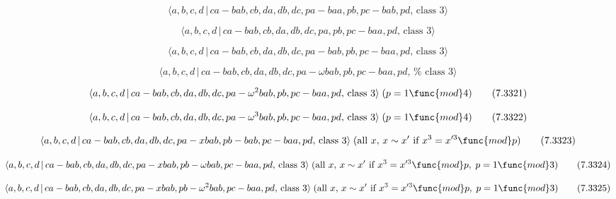 \documentclass[10pt]{article}
\begin{document}
\begin{equation}
\langle a,b,c,d\,|\,ca-bab,cb,da,db,dc,pa-baa,pb,pc-bab,pd,\,\text{class }%
3\rangle  \tag{7.3317}
\end{equation}

\begin{equation}
\langle a,b,c,d\,|\,ca-bab,cb,da,db,dc,pa,pb,pc-baa,pd,\,\text{class }%
3\rangle  \tag{7.3318}
\end{equation}

\begin{equation}
\langle a,b,c,d\,|\,ca-bab,cb,da,db,dc,pa-bab,pb,pc-baa,pd,\,\text{class }%
3\rangle  \tag{7.3319}
\end{equation}

\begin{equation}
\langle a,b,c,d\,|\,ca-bab,cb,da,db,dc,pa-\omega bab,pb,pc-baa,pd,\,\text{%
class }3\rangle  \tag{7.3320}
\end{equation}

\begin{equation}
\langle a,b,c,d\,|\,ca-bab,cb,da,db,dc,pa-\omega ^{2}bab,pb,pc-baa,pd,\,%
\text{class }3\rangle \;(p=1\func{mod}4)  \tag{7.3321}
\end{equation}

\begin{equation}
\langle a,b,c,d\,|\,ca-bab,cb,da,db,dc,pa-\omega ^{3}bab,pb,pc-baa,pd,\,%
\text{class }3\rangle \;(p=1\func{mod}4)  \tag{7.3322}
\end{equation}

\begin{equation}
\langle a,b,c,d\,|\,ca-bab,cb,da,db,dc,pa-xbab,pb-bab,pc-baa,pd,\,\text{%
class }3\rangle \;(\text{all }x,\,x \sim x^{\prime }\text{ if }x^3=x^{\prime
3}\func{mod}p)  \tag{7.3323}
\end{equation}

\begin{equation}
\langle a,b,c,d\,|\,ca-bab,cb,da,db,dc,pa-xbab,pb-\omega bab,pc-baa,pd,\,%
\text{class }3\rangle \;(\text{all }x,\,x \sim x^{\prime }\text{ if }%
x^3=x^{\prime 3}\func{mod}p,\;p=1\func{mod}3)  \tag{7.3324}
\end{equation}

\begin{equation}
\langle a,b,c,d\,|\,ca-bab,cb,da,db,dc,pa-xbab,pb-\omega ^{2}bab,pc-baa,pd,\,%
\text{class }3\rangle \;(\text{all }x,\,x \sim x^{\prime }\text{ if }%
x^3=x^{\prime 3}\func{mod}p,\;p=1\func{mod}3)  \tag{7.3325}
\end{equation}
\end{document}

